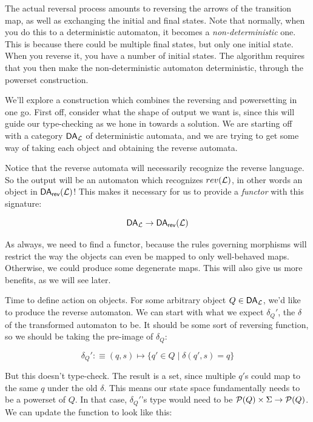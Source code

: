 The actual reversal process amounts to reversing the arrows of the transition map, as well as exchanging the initial and final states.
Note that normally, when you do this to a deterministic automaton, it becomes a \emph{non-deterministic} one.
This is because there could be multiple final states, but only one initial state.
When you reverse it, you have a number of initial states.
The algorithm requires that you then make the non-deterministic automaton deterministic, through the powerset construction.

We'll explore a construction which combines the reversing and powersetting in one go.
First off, consider what the shape of output we want is, since this will guide our type-checking as we hone in towards a solution.
We are starting off with a category $\mathsf{DA}_\mathcal L$ of deterministic automata, and we are trying to get some way of taking each object and obtaining the reverse automata.

\newcommand{\rev}{\mathsf{rev}}
Notice that the reverse automata will necessarily recognize the reverse language.
So the output will be an automaton which recognizes $rev(\mathcal L)$, in other words an object in $\DA_\rev(\calL)$!
This makes it necessary for us to provide a \emph{functor} with this signature:

\begin{equation}
    \DA_\calL \rightarrow \DA_\rev(\calL)
\end{equation}

As always, we need to find a functor, because the rules governing morphisms will restrict the way the objects can even be mapped to only well-behaved maps.
Otherwise, we could produce some degenerate maps.
This will also give us more benefits, as we will see later.

Time to define action on objects.
For some arbitrary object $Q \in \mathsf{DA}_\mathcal L$, we'd like to produce the reverse automaton.
We can start with what we expect $\delta_Q'$, the $\delta$ of the transformed automaton to be.
It should be some sort of reversing function, so we should be taking the pre-image of $\delta_Q$:

\begin{equation}
\delta_Q' :\equiv (q, s) \mapsto \{ q' \in Q \mid \delta(q', s) = q \}
\end{equation}

But this doesn't type-check.
The result is a set, since multiple $q'$s could map to the same $q$ under the old $\delta$.
This means our state space fundamentally needs to be a powerset of $Q$.
In that case, $\delta_Q'$'s type would need to be $\mathcal P(Q) \times \Sigma \rightarrow \mathcal P(Q)$.
We can update the function to look like this:

